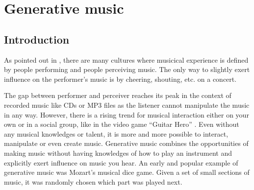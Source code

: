 	 \begin{acronym}[Soundgates]
	 \end{acronym}
	 

	\section{Generative music}
	

	\subsection{Introduction}
	As pointed out in \cite{Chandra2012}, there are many cultures where musicical experience is defined by people performing and people perceiving music. 
	The only way to slightly exert influence on the performer's music is by cheering, shouting, etc. on a concert. 
	
	The gap between performer and perceiver reaches its peak in the context of recorded music like CDs or MP3 files as the listener cannot manipulate the music in any way. 
	However, there is a rising trend for musical interaction either on your own or in a social group, like in the video game "`Guitar Hero"' \cite{Chandra2012, Planck2009}. 
	Even without any musical knowledges or talent, it is more and more possible to interact, manipulate or even create music.
	Generative music combines the opportunities of making music without having knowledges of how to play an instrument and explicitly exert influence on music you hear.
	An early and popular example of generative music was Mozart's musical dice game. Given a set of small sections of music, it was randomly chosen which part was played next.


